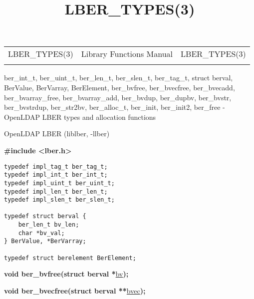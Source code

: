 \documentclass[]{article}
\title{LBER\_TYPES(3)}
\author{}
\date{}
\let\realtextbf=\textbf
\renewcommand{\textbf}[1]{\textcolor{boldcolor}{\realtextbf{#1}}}
\renewcommand{\emph}[1]{\underline{#1}}
\begin{document}
\maketitle

\begin{longtable}[c]{@{}lll@{}}
\toprule\addlinespace
LBER\_TYPES(3) & Library Functions Manual & LBER\_TYPES(3)
\\\addlinespace
\bottomrule
\end{longtable}


ber\_int\_t, ber\_uint\_t, ber\_len\_t, ber\_slen\_t, ber\_tag\_t,
struct berval, BerValue, BerVarray, BerElement, ber\_bvfree,
ber\_bvecfree, ber\_bvecadd, ber\_bvarray\_free, ber\_bvarray\_add,
ber\_bvdup, ber\_dupbv, ber\_bvstr, ber\_bvstrdup, ber\_str2bv,
ber\_alloc\_t, ber\_init, ber\_init2, ber\_free - OpenLDAP LBER types
and allocation functions


OpenLDAP LBER (liblber, -llber)


\textbf{\#include \textless{}lber.h\textgreater{}}

\begin{verbatim}
typedef impl_tag_t ber_tag_t;
typedef impl_int_t ber_int_t;
typedef impl_uint_t ber_uint_t;
typedef impl_len_t ber_len_t;
typedef impl_slen_t ber_slen_t;

typedef struct berval {
    ber_len_t bv_len;
    char *bv_val;
} BerValue, *BerVarray;

typedef struct berelement BerElement;
\end{verbatim}

\textbf{void ber\_bvfree(struct berval *}\emph{bv}\textbf{);}

\textbf{void ber\_bvecfree(struct berval **}\emph{bvec}\textbf{);}
\end{document}

